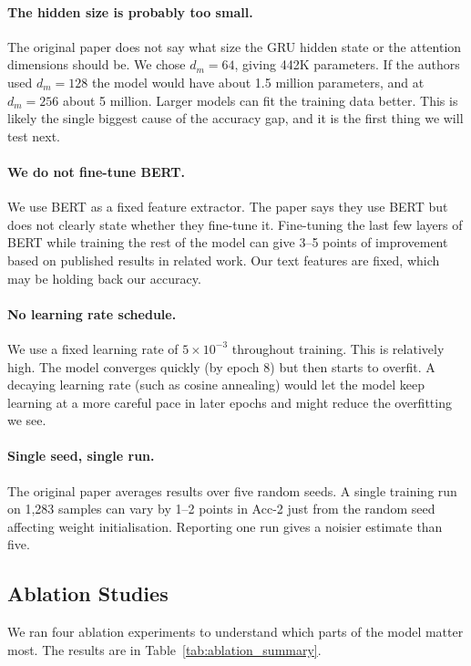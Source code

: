 \documentclass[11pt,twocolumn]{article}
\begin{document}
\paragraph{The hidden size is probably too small.} The original paper does not say what size the GRU hidden state or the attention dimensions should be. We chose $d_m = 64$, giving 442K parameters. If the authors used $d_m = 128$ the model would have about 1.5 million parameters, and at $d_m = 256$ about 5 million. Larger models can fit the training data better. This is likely the single biggest cause of the accuracy gap, and it is the first thing we will test next.

\paragraph{We do not fine-tune BERT.} We use BERT as a fixed feature extractor. The paper says they use BERT but does not clearly state whether they fine-tune it. Fine-tuning the last few layers of BERT while training the rest of the model can give 3--5 points of improvement based on published results in related work. Our text features are fixed, which may be holding back our accuracy.

\paragraph{No learning rate schedule.} We use a fixed learning rate of $5 \times 10^{-3}$ throughout training. This is relatively high. The model converges quickly (by epoch 8) but then starts to overfit. A decaying learning rate (such as cosine annealing) would let the model keep learning at a more careful pace in later epochs and might reduce the overfitting we see.

\paragraph{Single seed, single run.} The original paper averages results over five random seeds. A single training run on 1,283 samples can vary by 1--2 points in Acc-2 just from the random seed affecting weight initialisation. Reporting one run gives a noisier estimate than five.

\subsection{Ablation Studies}

We ran four ablation experiments to understand which parts of the model matter most. The results are in Table~\ref{tab:ablation_summary}.
\end{document}
